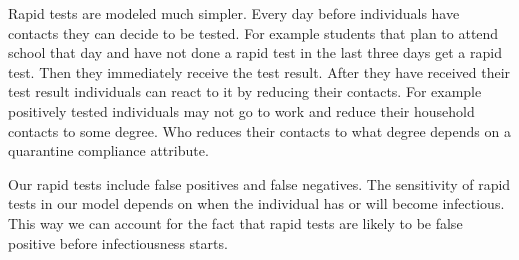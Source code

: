 Rapid tests are modeled much simpler. Every day before individuals have contacts they can
decide to be tested. For example students that plan to attend school that day and have
not done a rapid test in the last three days get a rapid test. Then they immediately
receive the test result. After they have received their test result individuals can react
to it by reducing their contacts. For example positively tested individuals may not go to
work and reduce their household contacts to some degree. Who reduces their contacts to
what degree depends on a quarantine compliance attribute.

Our rapid tests include false positives and false negatives. The sensitivity of rapid tests in our model depends on when the individual has
or will become infectious. This way we can account for the fact that rapid tests are
likely to be false positive before infectiousness starts.


